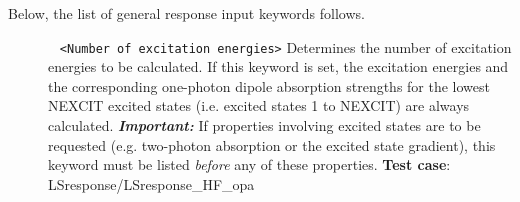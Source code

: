 Below, the list of general response input keywords follows.

\begin{description}
\item[] \verb| | \newline
\verb|<Number of excitation energies>|\newline
Determines the number of excitation energies to be calculated.
If this keyword is set, the excitation energies 
and the corresponding one-photon dipole absorption strengths
for the lowest NEXCIT excited states (i.e. excited states 1 to NEXCIT) 
are always calculated.
\emph{\bf Important:} If properties involving excited states
are to be requested (e.g. two-photon absorption or the excited state gradient),
this keyword must be listed \emph{before}
any of these properties. \newline
{\bf Test case}: LSresponse/LSresponse\_HF\_opa
\end{description}

